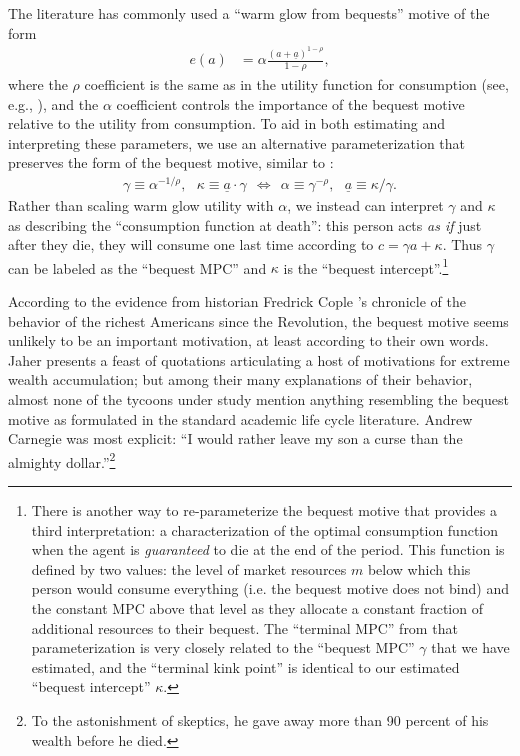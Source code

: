 \documentclass[12pt,letterpaper, fleqn]{article}
\newcommand{\CRRA}{\rho}
\newcommand{\cNrm}{c}
\newcommand{\aNrm}{a}
\newcommand{\bqstNrm}{e}
\begin{document}
The literature has commonly used a ``warm glow from bequests'' motive of the form
\begin{align}
    \bqstNrm(a) & = \alpha\frac{(a+\underline{a})^{1-\CRRA}}{1-\CRRA},
\end{align}
where the $\CRRA$ coefficient is the same as in the utility function for consumption (see, e.g., \cite{deNardiBequest}), and the $\alpha$ coefficient controls the importance of the bequest motive relative to the utility from consumption. To aid in both estimating and interpreting these parameters, we use an alternative parameterization that preserves the form of the bequest motive, similar to \cite{Love2009}:
\begin{align}
    \gamma \equiv \alpha^{-1/\CRRA}, ~~~ \kappa \equiv \underline{a} \cdot \gamma ~~\Longleftrightarrow~~ \alpha \equiv \gamma^{-\CRRA}, ~~~ \underline{a} \equiv \kappa / \gamma.
\end{align}
Rather than scaling warm glow utility with $\alpha$, we instead can interpret $\gamma$ and $\kappa$ as describing the ``consumption function at death'': this person acts \textit{as if} just after they die, they will consume one last time according to $\cNrm = \gamma \aNrm + \kappa$. Thus $\gamma$ can be labeled as the ``bequest MPC'' and $\kappa$ is the ``bequest intercept''.\footnote{There is another way to re-parameterize the bequest motive that provides a third interpretation: a characterization of the optimal consumption function when the agent is \textit{guaranteed} to die at the end of the period. This function is defined by two values: the level of market resources $m$ below which this person would consume everything (i.e. the bequest motive does not bind) and the constant MPC above that level as they allocate a constant fraction of additional resources to their bequest. The ``terminal MPC'' from that parameterization is very closely related to the ``bequest MPC'' $\gamma$ that we have estimated, and the ``terminal kink point'' is identical to our estimated ``bequest intercept'' $\kappa$.}

According to the evidence from historian Fredrick Cople \cite{jaherGilded}'s chronicle of the behavior of the richest Americans since the Revolution, the bequest motive seems unlikely to be an important motivation, at least according to their own words.
Jaher presents a feast of quotations articulating a host of motivations for extreme wealth accumulation; but among their many explanations of their behavior, almost none of the tycoons under study mention anything resembling the bequest motive as formulated in the standard academic life cycle literature.
Andrew Carnegie was most explicit: ``I would rather leave my son a curse than the almighty dollar.''\footnote{To the astonishment of skeptics, he gave away more than 90 percent of his wealth before he died.}
\end{document}
